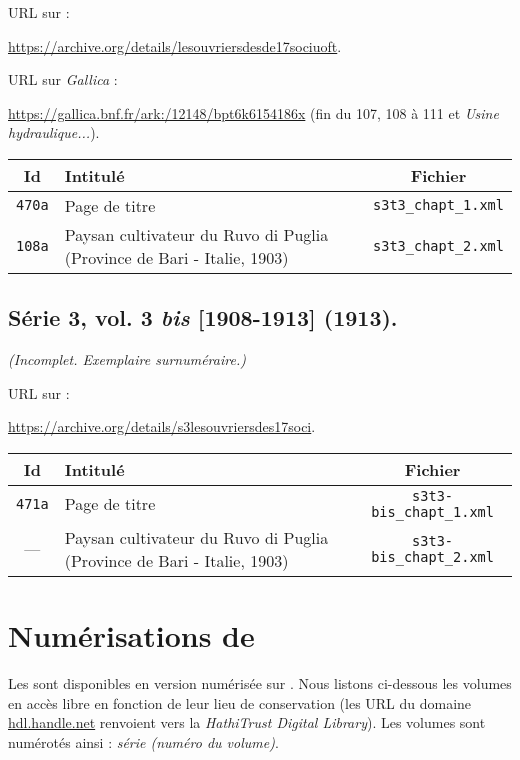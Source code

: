 URL sur \ia{} : 

\url{https://archive.org/details/lesouvriersdesde17sociuoft}.

URL sur \textit{Gallica} : 

\url{https://gallica.bnf.fr/ark:/12148/bpt6k6154186x} (fin du \no{} 107, \no{} 108 à 111 et \textit{Usine hydraulique...}).

\begin{center}
\begin{longtable}{ | c | p{9.5cm} | c | }
\hline
Id & Intitulé & Fichier \\ \hline
\texttt{470a} & Page de titre & \texttt{s3t3\_chapt\_1.xml} \\ \hline
\texttt{108a} & Paysan cultivateur du Ruvo di Puglia (Province de Bari - Italie, 1903) & \texttt{s3t3\_chapt\_2.xml} \\ \hline
\end{longtable}
\end{center}

\subsection{Série 3, vol. 3 \textit{bis} [1908-1913] (1913).}
\label{mappings3t3bis}

\textit{(Incomplet. Exemplaire surnuméraire.)}

URL sur \ia{} : 

\url{https://archive.org/details/s3lesouvriersdes17soci}.

\begin{center}
\begin{longtable}{ | c | p{9.5cm} | c | }
\hline
Id & Intitulé & Fichier \\ \hline
\texttt{471a} & Page de titre & \texttt{s3t3-bis\_chapt\_1.xml} \\ \hline
--- & Paysan cultivateur du Ruvo di Puglia (Province de Bari - Italie, 1903) & \texttt{s3t3-bis\_chapt\_2.xml} \\ \hline
\end{longtable}
\end{center}

\clearpage

\section{Numérisations de \gb}\label{numgb}

Les \odm{} sont disponibles en version numérisée sur \gb. Nous listons ci-dessous les volumes en accès libre en fonction de leur lieu de conservation (les URL du domaine \url{hdl.handle.net} renvoient vers la \textit{HathiTrust Digital Library}). Les volumes sont numérotés ainsi : \textit{série (numéro du volume)}.

